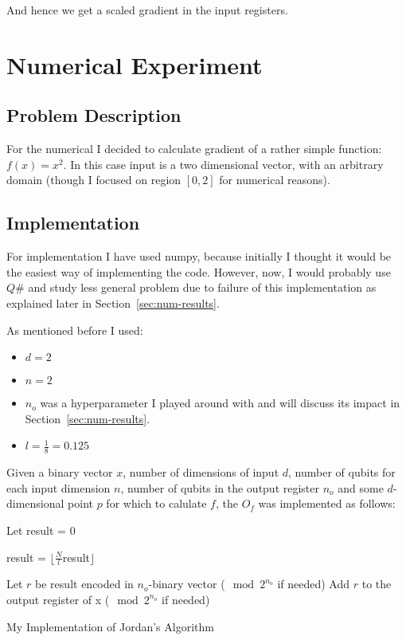 \documentclass{article}
\begin{document}
And hence we get a scaled gradient in the input registers.

\section{Numerical Experiment}
\subsection{Problem Description}
For the numerical I decided to calculate gradient of a rather simple function: $f(x) = x^2$.
In this case input is a two dimensional vector, with an arbitrary domain (though I focused on region $[0, 2]$ for numerical reasons).

\subsection{Implementation}
For implementation I have used numpy, because initially I thought it would be the easiest way of implementing the code.
However, now, I would probably use $Q\#$ and study less general problem due to failure of this implementation as explained later in
Section~\ref{sec:num-results}.

As mentioned before I used:
\begin{itemize}
    \item $d = 2$
    \item $n = 2$
    \item $n_o$ was a hyperparameter I played around with and will discuss its impact in Section~\ref{sec:num-results}.
    \item $l = \frac{1}{8} = 0.125$
\end{itemize}

Given a binary vector $x$, number of dimensions of input $d$, number of qubits for each input dimension $n$,
number of qubits in the output register $n_o$ and some $d$-dimensional point $p$ for which to calulate $f$,
the $O_f$ was implemented as follows:

\begin{algorithm}[H]
    \SetAlgoLined
    Let result = 0\;

    result = $\lfloor\frac{N}{l}$result$\rfloor$\;

    Let $r$ be result encoded in $n_o$-binary vector ($\mod 2^{n_o}$ if needed)\;
    Add $r$ to the output register of x ($\mod 2^{n_o}$ if needed)\;

    \caption{My Implementation of Jordan's Algorithm}
    \label{alg:my-jordan}
\end{algorithm}
\end{document}
